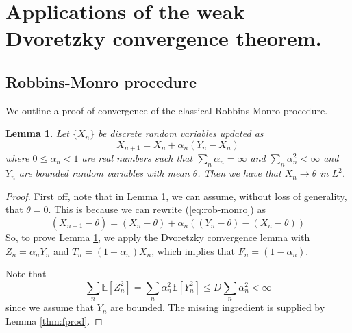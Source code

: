 \documentclass{article}
\def\E{\mathbb{E}}
\newtheorem{lemma}[theorem]{Lemma}
\newtheorem*{remark}{Remark:}
\begin{document}
\section{Applications of the weak Dvoretzky convergence theorem.}
\subsection{Robbins-Monro procedure}
We outline a proof of convergence of the classical Robbins-Monro procedure.
\begin{lemma}\label{lem:qlearn-ess}
Let $\{X_n\}$ be discrete random variables updated as
\begin{equation}\label{eq:rob-monro}
X_{n+1} = X_n + \alpha_n (Y_n - X_n)    
\end{equation}
where $ 0 \le \alpha_n < 1$ are real numbers such that $\sum_n \alpha_n = \infty$ and $\sum_n \alpha_n^2 < \infty$ and $Y_n$ are bounded random variables with mean $\theta$. Then we have that $X_n \to \theta$ in $L^2$.
\end{lemma}
\begin{proof}

First off, note that in Lemma \ref{lem:qlearn-ess}, we can assume, without loss of generality, that $\theta = 0$. 
This is because we can rewrite (\ref{eq:rob-monro}) as 
\[ 
    (X_{n+1} - \theta)= (X_n - \theta) + \alpha_n ((Y_n-\theta) - (X_n-\theta))    
\] 
So, to prove Lemma \ref{lem:qlearn-ess}, we apply the Dvoretzky convergence lemma with $Z_n = \alpha_n Y_n$ and $T_n = (1 - \alpha_n)X_n$, which implies that $F_n = (1 - \alpha_n)$. 

Note that $$\sum_n\E[Z_n^2] = \sum_n \alpha_n^2 \E[Y_n^2] \le D \sum_n \alpha_n^2 < \infty$$ since we assume that $Y_n$ are bounded. The missing ingredient is supplied by Lemma \ref{thm:fprod}.
\end{proof}
\end{document}
